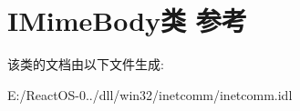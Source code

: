 \hypertarget{class_i_mime_body}{}\section{I\+Mime\+Body类 参考}
\label{class_i_mime_body}


该类的文档由以下文件生成\+:\begin{DoxyCompactItemize}
\item 
E\+:/\+React\+O\+S-\/0../dll/win32/inetcomm/inetcomm.\+idl\end{DoxyCompactItemize}
